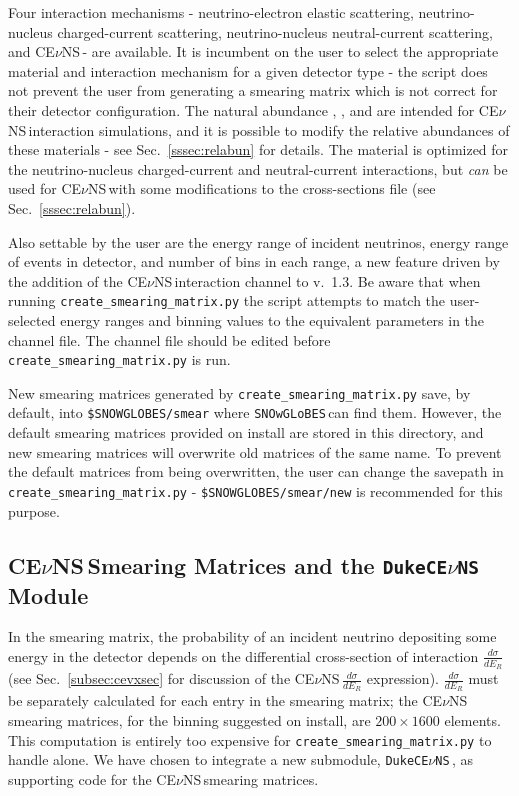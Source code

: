 \documentclass{article}
\newcommand{\cev}{CE$\nu$NS\,}
\newcommand{\snow}{\texttt{SNOwGLoBES}\,}
\newcommand{\dukecev}{\texttt{DukeCE$\nu$NS}\,}
\begin{document}
\noindent Four interaction mechanisms - neutrino-electron elastic scattering, neutrino-nucleus charged-current scattering, neutrino-nucleus neutral-current scattering, and \cev - are available. It is incumbent on the user to select the appropriate material and interaction mechanism for a given detector type - the script does not prevent the user from generating a smearing matrix which is not correct for their detector configuration. The natural abundance , , and  are intended for \cev interaction simulations, and it is possible to modify the relative abundances of these materials - see Sec.~\ref{sssec:relabun} for details. The  material is optimized for the neutrino-nucleus charged-current and neutral-current interactions, but \textit{can} be used for \cev with some modifications to the cross-sections file (see Sec.~\ref{sssec:relabun}).  

Also settable by the user are the energy range of incident neutrinos, energy range of events in detector, and number of bins in each range, a new feature driven by the addition of the \cev interaction channel to v.~1.3. Be aware that when running \texttt{create\_smearing\_matrix.py} the script attempts to match the user-selected energy ranges and binning values to the equivalent parameters in the channel file. The channel file should be edited before \texttt{create\_smearing\_matrix.py} is run.

New smearing matrices generated by \texttt{create\_smearing\_matrix.py} save, by default, into \texttt{\$SNOWGLOBES/smear} where \snow can find them. However, the default smearing matrices provided on install are stored in this directory, and new smearing matrices will overwrite old matrices of the same name. To prevent the default matrices from being overwritten, the user can change the savepath in \texttt{create\_smearing\_matrix.py} - \texttt{\$SNOWGLOBES/smear/new} is recommended for this purpose.

\subsection{\cev Smearing Matrices and the \dukecev Module} \label{subsec:cevnssmearmat}

In the smearing matrix, the probability of an incident neutrino depositing some energy in the detector depends on the differential cross-section of interaction $\frac{d\sigma}{dE_R}$ (see Sec.~\ref{subsec:cevxsec} for discussion of the \cev $\frac{d\sigma}{dE_R}$ expression). $\frac{d\sigma}{dE_R}$ must be separately calculated for each entry in the smearing matrix; the \cev smearing matrices, for the binning suggested on install, are $200 \times 1600$ elements. This computation is entirely too  expensive for \texttt{create\_smearing\_matrix.py} to handle alone. We have chosen to integrate a new submodule, \dukecev, as supporting code for the \cev smearing matrices.
\end{document}
